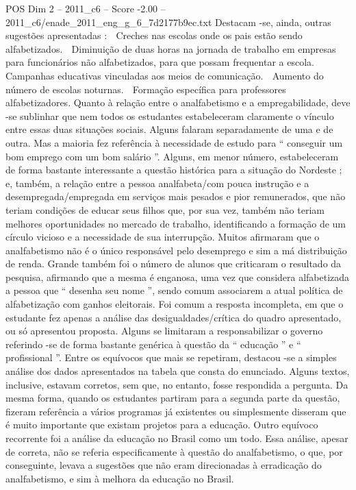 \begin{textsample}{POS Dim 2 – 2011\_c6 – Score -2.00 – 2011\_c6/enade\_2011\_eng\_g\_6\_7d2177b9ec.txt}
Destacam -se, ainda, outras sugestões apresentadas :  Creches nas escolas onde os pais estão sendo alfabetizados.  Diminuição de duas horas na jornada de trabalho em empresas para funcionários não alfabetizados, para que possam frequentar a escola.  Campanhas educativas vinculadas aos meios de comunicação.  Aumento do número de escolas noturnas.  Formação específica para professores alfabetizadores.
Quanto à relação entre o analfabetismo e a empregabilidade, deve -se sublinhar que nem todos os estudantes estabeleceram claramente o vínculo entre essas duas situações sociais.
Alguns falaram separadamente de uma e de outra.
Mas a maioria fez referência à necessidade de estudo para “ conseguir um bom emprego com um bom salário ”.
Alguns, em menor número, estabeleceram de forma bastante interessante a questão histórica para a situação do Nordeste ; e, também, a relação entre a pessoa analfabeta/com pouca instrução e a desempregada/empregada em serviços mais pesados e pior remunerados, que não teriam condições de educar seus filhos que, por sua vez, também não teriam melhores oportunidades no mercado de trabalho, identificando a formação de um círculo vicioso e a necessidade de sua interrupção.
Muitos afirmaram que o analfabetismo não é o único responsável pelo desemprego e sim a má distribuição de renda.
Grande também foi o número de alunos que criticaram o resultado da pesquisa, afirmando que a mesma é enganosa, uma vez que considera alfabetizada a pessoa que “ desenha seu nome ”, sendo comum associarem a atual política de alfabetização com ganhos eleitorais.
Foi comum a resposta incompleta, em que o estudante fez apenas a análise das desigualdades/crítica do quadro apresentado, ou só apresentou proposta.
Alguns se limitaram a responsabilizar o governo referindo -se de forma bastante genérica à questão da “ educação ” e “ profissional ”.
Entre os equívocos que mais se repetiram, destacou -se a simples análise dos dados apresentados na tabela que consta do enunciado.
Alguns textos, inclusive, estavam corretos, sem que, no entanto, fosse respondida a pergunta.
Da mesma forma, quando os estudantes partiram para a segunda parte da questão, fizeram referência a vários programas já existentes ou simplesmente disseram que é muito importante que existam projetos para a educação.
Outro equívoco recorrente foi a análise da educação no Brasil como um todo.
Essa análise, apesar de correta, não se referia especificamente à questão do analfabetismo, o que, por conseguinte, levava a sugestões que não eram direcionadas à erradicação do analfabetismo, e sim à melhora da educação no Brasil.

\end{textsample}
